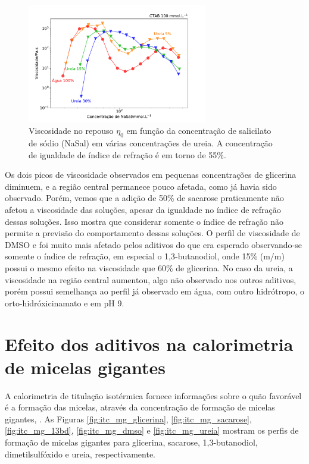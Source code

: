 			\begin{figure}[htb]
				\centering
				\includegraphics[width=0.7\textwidth]{imagens/reologia/RH_ureia}
				\caption{Viscosidade no repouso \(\eta_0\) em função da concentração de salicilato de sódio (NaSal) em várias concentrações de ureia. A concentração de igualdade de índice de refração é em torno de 55\%.}
				\label{fig:rh_ureia}
			\end{figure} 
			
			Os dois picos de viscosidade observados em pequenas concentrações de glicerina diminuem, e a região central permanece pouco afetada, como já havia sido observado.\cite{Hoffmann2010} Porém, vemos que a adição de 50\% de sacarose praticamente não afetou a viscosidade das soluções, apesar da igualdade no índice de refração dessas soluções. Isso mostra que considerar somente o índice de refração não permite a previsão do comportamento dessas soluções. O perfil de viscosidade de DMSO e \BD{} foi muito mais afetado pelos aditivos do que era esperado observando-se somente o índice de refração, em especial o 1,3-butanodiol, onde 15\% (m/m) possui o mesmo efeito na viscosidade que 60\% de glicerina. No caso da ureia, a viscosidade na região central aumentou, algo não observado nos outros aditivos, porém possui semelhança ao perfil já observado em água, com outro hidrótropo, o orto-hidróxicinamato e \CTAB{} em pH 9. \cite{Clinckspoor2015}
			
		\FloatBarrier
		
		\section{Efeito dos aditivos na calorimetria de micelas gigantes}  
		\label{sec:efeito_aditivos_calorimetria_mg}
			A calorimetria de titulação isotérmica fornece informações sobre o quão favorável é a formação das micelas, através da concentração de formação de micelas gigantes, \cwlm. As Figuras \ref{fig:itc_mg_glicerina}, \ref{fig:itc_mg_sacarose}, \ref{fig:itc_mg_13bd}, \ref{fig:itc_mg_dmso} e \ref{fig:itc_mg_ureia} mostram os perfis de formação de micelas gigantes para glicerina, sacarose, 1,3-butanodiol, dimetilsulfóxido e ureia, respectivamente.
		
